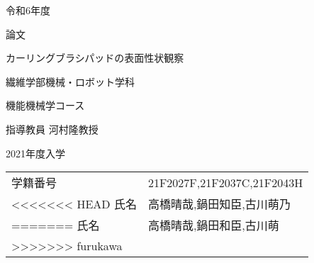 \documentclass[main]{subfiles}
\begin{document}
\begin{titlepage}
    \fontsize{30pt}{30pt} \selectfont

    \centering
    \Huge
    令和6年度
    \vspace{15pt}

    論文
    \vspace{45pt}

    カーリングブラシパッドの表面性状観察
    \vspace{45pt}

    繊維学部機械・ロボット学科
    \vspace{15pt}

    機能機械学コース
    \vspace{15pt}

    指導教員 河村隆教授
    \vspace{45pt}

    2021年度入学
    \vspace{15pt}

    \begin{tabular}{ll}
    学籍番号 & 21F2027F,21F2037C,21F2043H\\
<<<<<<< HEAD
    氏名   & 高橋晴哉,鍋田知臣,古川萌乃\\
=======
    氏名   & 高橋晴哉,鍋田和臣,古川萌\\
>>>>>>> furukawa

    \end{tabular}
    \normalsize

\end{titlepage}
\end{document}
